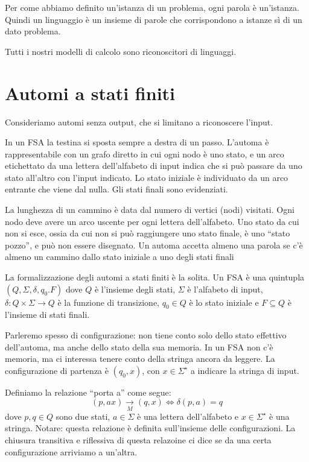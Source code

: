 Per come abbiamo definito un'istanza di un problema, ogni parola \`e un'istanza.
Quindi un linguaggio \`e un insieme di parole che corrispondono a istanze s\`i di un dato problema.

Tutti i nostri modelli di calcolo sono riconoscitori di linguaggi.

\section{Automi a stati finiti}

Consideriamo automi senza output, che si limitano a riconoscere l'input.

In un FSA la testina si sposta sempre a destra di un passo.
L'automa \`e rappresentabile con un grafo diretto in cui ogni nodo \`e uno stato, e un arco etichettato da una lettera dell'alfabeto di input  indica che si pu\`o passare da uno stato all'altro con l'input indicato.
Lo stato iniziale \`e individuato da un arco entrante che viene dal nulla.
Gli stati finali sono evidenziati.

La lunghezza di un cammino \`e data dal numero di vertici (nodi) visitati.
Ogni nodo deve avere un arco uscente per ogni lettera dell'alfabeto.
Uno stato da cui non si esce, ossia da cui non si pu\`o raggiungere uno stato finale, \`e uno ``stato pozzo'', e pu\`o non essere disegnato.
Un automa accetta almeno una parola se c'\`e almeno un cammino dallo stato iniziale a uno degli stati finali

La formalizzazione degli automi a stati finiti \`e la solita.
Un FSA \`e una quintupla $(Q, \Sigma, \delta, q_0. F)$ dove $Q$ \`e l'insieme degli stati, $\Sigma$ \`e l'alfabeto di input, $\delta : Q \times \Sigma \to Q$ \`e la funzione di transizione, $q_0 \in Q$ \`e lo stato iniziale e $F \subseteq Q$ \`e l'insieme di stati finali.

Parleremo spesso di configurazione: non tiene conto solo dello stato effettivo dell'automa, ma anche dello stato della sua memoria.
In un FSA non c'\`e memoria, ma ci interessa tenere conto della stringa ancora da leggere.
La configurazione di partenza \`e $(q_0, x)$, con $x \in \Sigma^{\star}$ a indicare la stringa di input.

Definiamo la relazione ``porta a'' come segue:
\[
	(p, ax) \underset{M}{\to} (q,x) \iff \delta(p,a) = q
\]
dove $p,q \in Q$ sono due stati, $a \in \Sigma$ \`e una lettera dell'alfabeto e $x \in \Sigma^{\star}$ \`e una stringa.
Notare: questa relazione \`e definita sull'insieme delle configurazioni.
La chiusura transitiva e riflessiva di questa relazoine ci dice se da una certa configurazione arriviamo a un'altra.

